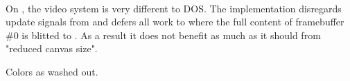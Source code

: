 \pagebreak
{}\\
\par

On \NeXTns{}, the video system is very different to DOS. The implementation disregards update signals from  and defers all work to  where the full content of framebuffer \#0 is blitted to . As a result it does not benefit as much as it should from "reduced canvas size".\\
\par
Colors as washed out.\\
\par
{}

